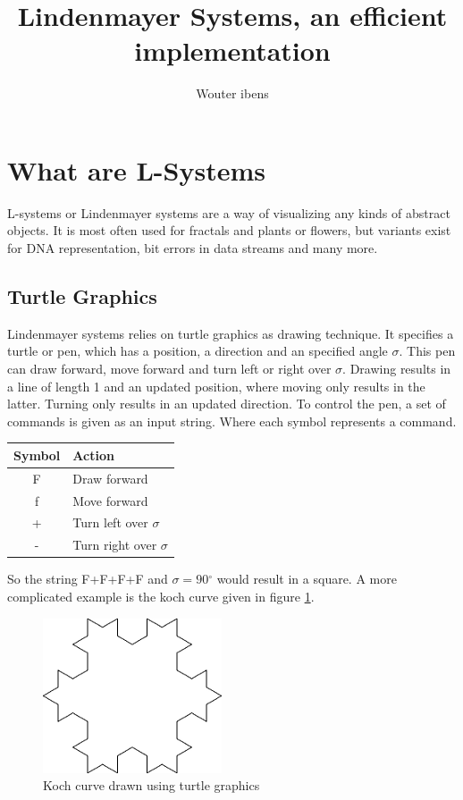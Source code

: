 \documentclass[11pt,a4paper]{article}
\author{Wouter ibens}
\title{Lindenmayer Systems, an efficient implementation}
\newcommand{\degree}{\ensuremath{^\circ}}
\begin{document}
\maketitle
\tableofcontents
\newpage
\section{What are L-Systems}
L-systems or Lindenmayer systems are a way of visualizing any kinds of abstract objects. It is most often used for fractals and plants or flowers, but variants exist for DNA representation, bit errors in data streams and many more.

\subsection{Turtle Graphics}
Lindenmayer systems relies on turtle graphics as drawing technique. It specifies a turtle or pen, which has a position, a direction and an specified angle $\sigma$. This pen can draw forward, move forward and turn left or right over $\sigma$. Drawing results in a line of length 1 and an updated position, where moving only results in the latter. Turning only results in an updated direction.
To control the pen, a set of commands is given as an input string. Where each symbol represents a command.
\begin{center}
\begin{tabular}{c | l}
Symbol & Action \\ \hline
F & Draw forward \\
f & Move forward \\
+ & Turn left over $\sigma$ \\
- & Turn right over $\sigma$
\end{tabular}
\end{center}

So the string F+F+F+F and $\sigma = 90\degree$ would result in a square. A more complicated example is the koch curve given in figure \ref{fig:koch}.
\begin{figure}[h!]
  \centering
  \includegraphics[]{koch.png}
  \caption{Koch curve drawn using turtle graphics}
  \label{fig:koch}
\end{figure}
\end{document}
